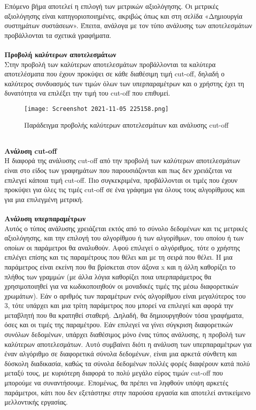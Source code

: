 \noindent Επόμενο βήμα αποτελεί η επιλογή των μετρικών αξιολόγησης. Οι μετρικές αξιολόγησης είναι κατηγοριοποιημένες, ακριβώς όπως και στη σελίδα «Δημιουργία συστημάτων συστάσεων». Έπειτα, ανάλογα με τον τύπο ανάλυσης των αποτελεσμάτων προβάλλονται τα σχετικά γραφήματα. \\ \\
\textbf{Προβολή καλύτερων αποτελεσμάτων}\\
Στην προβολή των καλύτερων αποτελεσμάτων προβάλλονται τα καλύτερα αποτελέσματα που έχουν προκύψει σε κάθε διαθέσιμη τιμή cut-off, δηλαδή ο καλύτερος συνδυασμός των τιμών όλων των υπερπαραμέτρων και ο χρήστης έχει τη δυνατότητα να επιλέξει την τιμή του cut-off που επιθυμεί.\\
\begin{figure}[!htb]
	\centering
	\texttt{[image: Screenshot 2021-11-05 225158.png]}
	\caption{Παράδειγμα προβολής καλύτερων αποτελεσμάτων και ανάλυσης cut-off}
	\label{fig:best}
\end{figure}
\\
\textbf{Ανάλυση cut-off}\\
Η διαφορά της ανάλυσης cut-off από την προβολή των καλύτερων αποτελεσμάτων είναι στο είδος των γραφημάτων που παρουσιάζονται και πως δεν χρειάζεται να επιλεγεί κάποια τιμή cut-off. Πιο συγκεκριμένα, προβάλλονται οι τιμές που έχουν προκύψει για όλες τις τιμές cut-off σε ένα γράφημα για όλους τους αλγορίθμους και για μια επιλεγμένη μετρική.\\\\
\newpage
\noindent \textbf{Ανάλυση υπερπαραμέτρων}
\\ Αυτός ο τύπος ανάλυσης χρειάζεται εκτός από το σύνολο δεδομένων και τις μετρικές αξιολόγησης, και την επιλογή του αλγορίθμου ή των αλγορίθμων, του οποίου ή των οποίων οι παράμετροι θα αναλυθούν. Αφού επιλεγεί ο αλγόριθμος, τότε ο χρήστης επιλέγει επίσης και τις παραμέτρους που θέλει και με τη σειρά που θέλει. Η μια παράμετρος είναι εκείνη που θα βρίσκεται στον άξονα x και η άλλη καθορίζει το πλήθος των γραμμών (με άλλα λόγια καθορίζει ποια υπερπαράμετρος θα χρησιμοποιηθεί για να κωδικοποιηθούν οι μοναδικές τιμές της μέσω διαφορετικών χρωμάτων). Εάν ο αριθμός των παραμέτρων ενός αλγορίθμου είναι μεγαλύτερος του 3, τότε υπάρχει και μια τρίτη παράμετρος που μπορεί να επιλεγεί και αφορά την μεταβλητή που θα κρατηθεί σταθερή. Δηλαδή, θα δημιουργηθούν τόσα γραφήματα, όσες και οι τιμές της παραμέτρου. Εάν επιλεγεί να γίνει σύγκριση διαφορετικών συνόλων δεδομένων, υπάρχει διαθέσιμος μόνο ένας τύπος ανάλυσης, η προβολή των καλύτερων αποτελεσμάτων. Αυτό συμβαίνει διότι η ανάλυση των υπερπαραμέτρων για έναν αλγόριθμο σε διαφορετικά σύνολα δεδομένων, είναι μια αρκετά σύνθετη και δύσκολη διαδικασία, καθώς τα σύνολα δεδομένων πολλές φορές διαφέρουν κατά πολύ μεταξύ τους, με κυριότερη διαφορά το πολύ μεγάλο εύρος τιμών cut-off που μπορούμε να συναντήσουμε. Επομένως, θα πρέπει να ληφθούν υπόψη αρκετές παράμετροι, κάτι που δεν εξετάστηκε στην παρούσα εργασία και αποτελεί αντικείμενο μελλοντικής εργασίας.
